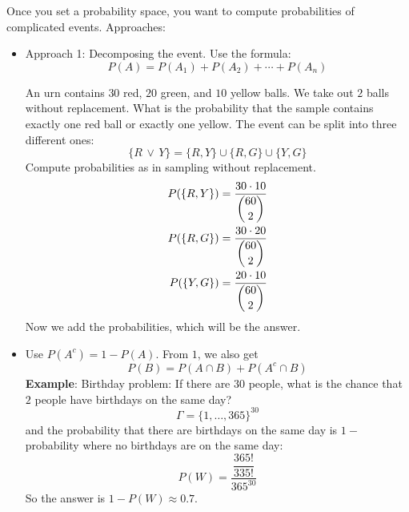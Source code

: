 \documentclass{report}
\begin{document}
Once you set a probability space, you want to compute probabilities of complicated events. Approaches:
    \begin{itemize}
        \item Approach 1: Decomposing the event. Use the formula:
            \begin{equation*}
                P(A) = P(A_{1}) + P(A_{2}) + \cdots + P(A_{n})
            \end{equation*}
            \begin{examples}
                \begin{example}
                    An urn contains $30$ red, $20$ green, and $10$ yellow balls. We take out $2$ balls without replacement. What is the probability that the sample contains exactly one red ball or exactly one yellow. The event can be split into three different ones:
                        \begin{equation*}
                            \{R \, \lor \, Y\} = \{R, Y\} \cup \{R, G\} \cup \{Y, G\}
                        \end{equation*}
                    Compute probabilities as in sampling without replacement. 
                        \begin{align*}
                            P(\{R, Y\}) &= \dfrac{30 \cdot 10}{\dbinom{60}{2}} \\
                            P(\{R, G\}) &= \dfrac{30 \cdot 20}{\dbinom{60}{2}} \\
                            P(\{Y, G\}) &= \dfrac{20 \cdot 10}{\dbinom{60}{2}}   
                        \end{align*}
                    Now we add the probabilities, which will be the answer.
                \end{example}
            \end{examples}

        \item Use $P(A^{c}) = 1 - P(A)$. From $1$, we also get
            \begin{equation*}
                P(B) = P(A \cap B) + P(A^{c} \cap B)
            \end{equation*}
        \textbf{Example}: Birthday problem: If there are $30$ people, what is the chance that $2$ people have birthdays on the same day?
            \begin{equation*}
                \Gamma = \{1, \ldots, 365\}^{30}
            \end{equation*}
        and the probability that there are birthdays on the same day is $1 - $ probability where no birthdays are on the same day:
            \begin{equation*}
                P(W) = \dfrac{\dfrac{365!}{335!}}{365^{30}}
            \end{equation*}
        So the answer is $1 - P(W) \approx 0.7$.


\end{itemize}
\end{document}
